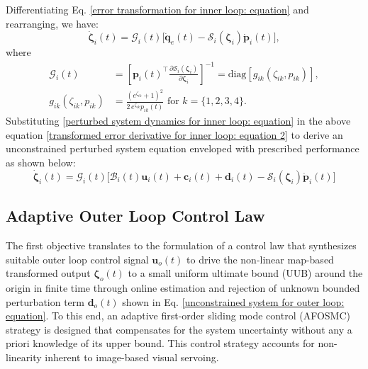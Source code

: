 \documentclass[lettersize,journal]{IEEEtran}
\begin{document}
Differentiating Eq. \eqref{error transformation for inner loop: equation} and rearranging, we have:
\begin{equation} \label{transformed error derivative for inner loop: equation 2}
    \dot{\boldsymbol{\zeta}}_i(t) = \mathcal{G}_i(t) \big[\dot{\boldsymbol{q}}_{e}(t) - \mathcal{S}_i(\boldsymbol{\zeta}_i) \dot{\boldsymbol{p}}_i(t)\big],    
\end{equation}
where
\begin{align*}
    \mathcal{G}_i(t) &= \left[\boldsymbol{p}_i(t)^{\top} \frac{\partial \mathcal{S}_i(\boldsymbol{\zeta}_i)}{\partial \boldsymbol{\zeta}_i}\right]^{-1} = \text{diag}[g_{ik}(\zeta_{ik}, p_{ik})], \nonumber \\
    g_{ik}(\zeta_{ik}, p_{ik}) &= \frac{(e^{\zeta_{ik}}+1)^2}{2\,e^{\zeta_{ik}} p_{ik}(t)} \text{ for } k = \{1, 2, 3, 4\}. \nonumber
\end{align*}
Substituting  \eqref{perturbed system dynamics for inner loop: equation} in the above equation \eqref{transformed error derivative for inner loop: equation 2} to derive an unconstrained perturbed system equation enveloped with prescribed performance as shown below:
\begin{equation} \label{unconstrained system for inner loop: equation}
    \dot{\boldsymbol{\zeta}}_i(t) = \mathcal{G}_i(t) \big[\mathcal{B}_i(t) \boldsymbol{u}_i(t) + \boldsymbol{c}_i(t) + \boldsymbol{d}_i(t) - \mathcal{S}_i(\boldsymbol{\zeta}_i) \dot{\boldsymbol{p}}_i(t) \big]
\end{equation}

\subsection{Adaptive Outer Loop Control Law} \label{adaptive controller for outer loop : section}
The first objective translates to the formulation of a control law that synthesizes suitable outer loop control signal $\boldsymbol{u}_o(t)$ to drive the non-linear map-based transformed output $\boldsymbol{\zeta}_o(t)$ to a small uniform ultimate bound (UUB) around the origin in finite time through online estimation and rejection of unknown bounded perturbation term $\boldsymbol{d}_o(t)$ shown in Eq. \eqref{unconstrained system for outer loop: equation}.
To this end, an adaptive first-order sliding mode control (AFOSMC) strategy is designed that compensates for the system uncertainty without any a priori knowledge of its upper bound.
This control strategy accounts for non-linearity inherent to image-based visual servoing.
\end{document}
